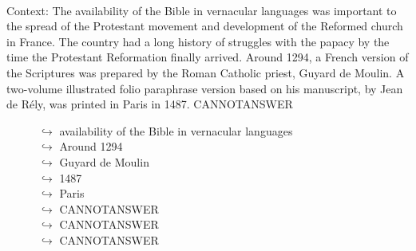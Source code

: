 \documentclass[11pt,a4paper, onecolumn]{article}
\begin{document}
\\ Context: The availability of the Bible in vernacular languages was important to the spread of the Protestant movement and development of the Reformed church in France. The country had a long history of struggles with the papacy by the time the Protestant Reformation finally arrived. Around 1294, a French version of the Scriptures was prepared by the Roman Catholic priest, Guyard de Moulin. A two-volume illustrated folio paraphrase version based on his manuscript, by Jean de Rély, was printed in Paris in 1487. CANNOTANSWER

\begin{figure}[t] \small \begin{tcolorbox}[boxsep=0pt,left=5pt,right=0pt,top=2pt,colback = yellow!5] \begin{dialogue}
 \small 
\colorbox{pink!25}{$\hookrightarrow$}
{ availability of the Bible in vernacular languages }
\\
\colorbox{pink!25}{$\hookrightarrow$}
{ Around 1294 }
\\
\colorbox{pink!25}{$\hookrightarrow$}
{ Guyard de Moulin }
\\
\colorbox{pink!25}{$\hookrightarrow$}
{ 1487 }
\\
\colorbox{pink!25}{$\hookrightarrow$}
{ Paris }
\\
\colorbox{pink!25}{$\hookrightarrow$}
{ CANNOTANSWER }
\\
\colorbox{pink!25}{$\hookrightarrow$}
{ CANNOTANSWER }
\\
\colorbox{pink!25}{$\hookrightarrow$}
{ CANNOTANSWER }
 \end{dialogue}\end{tcolorbox}\end{figure}\begin{figure}[t] \small \begin{tcolorbox}[boxsep=0pt,left=5pt,right=0pt,top=2pt,colback = yellow!5] \begin{dialogue}

\end{dialogue}
\end{tcolorbox}
\end{figure}
\end{document}

